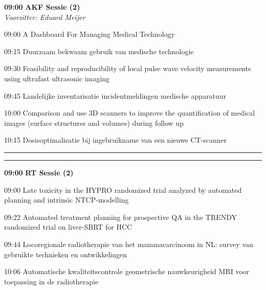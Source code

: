 \documentclass[a4paper,10pt]{report}
\begin{document}
\begin{multicols*}{3}
\begin{packed_enum}
\item[\textbf{09:00}] \textbf{AKF Sessie (2)}\\\textit{Voorzitter: Eduard Meijer}
\item[09:00] A Dashboard For Managing Medical Technology
\item[09:15] Duurzaam bekwaam gebruik van medische technologie
\item[09:30] Feasibility and reproducibility of local pulse wave velocity measurements using ultrafast ultrasonic imaging
\item[09:45] Landelijke inventarisatie incidentmeldingen medische apparatuur 
\item[10:00] Comparison and use 3D scanners to improve the quantification of medical images (surface structures and volumes) during follow up 
\item[10:15] Dosisoptimalisatie bij ingebruikname van een nieuwe CT-scanner 
\end{packed_enum} %

\vfill

\columnbreak

\hrule\vspace{2mm}
\vspace{2mm}\hrule\strut

\vfill

\begin{packed_enum}
\item[\textbf{09:00}]{\textbf{RT Sessie (2)}}
\item[09:00] Late toxicity in the HYPRO randomized trial analyzed by automated planning and intrinsic NTCP-modelling
\item[09:22] Automated treatment planning for prospective QA in the TRENDY randomized trial on liver-SBRT for HCC
\item[09:44] Locoregionale radiotherapie van het mammacarcinoom in NL: survey van gebruikte technieken en ontwikkelingen
\item[10:06] Automatische kwaliteitscontrole geometrische nauw\-keur\-igheid MRI voor toepassing in de radiotherapie
\end{packed_enum} %



\end{multicols*}
\end{document}
